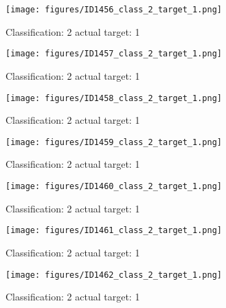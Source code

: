 \begin{figure}[h!]
\begin{center}
\texttt{[image: figures/ID1456\_class\_2\_target\_1.png]}
\end{center}
\caption{ Classification: 2 actual target: 1}
\label{fig:ID1456_class_2_target_1}
\end{figure}
\begin{figure}[h!]
\begin{center}
\texttt{[image: figures/ID1457\_class\_2\_target\_1.png]}
\end{center}
\caption{ Classification: 2 actual target: 1}
\label{fig:ID1457_class_2_target_1}
\end{figure}
\begin{figure}[h!]
\begin{center}
\texttt{[image: figures/ID1458\_class\_2\_target\_1.png]}
\end{center}
\caption{ Classification: 2 actual target: 1}
\label{fig:ID1458_class_2_target_1}
\end{figure}
\begin{figure}[h!]
\begin{center}
\texttt{[image: figures/ID1459\_class\_2\_target\_1.png]}
\end{center}
\caption{ Classification: 2 actual target: 1}
\label{fig:ID1459_class_2_target_1}
\end{figure}
\begin{figure}[h!]
\begin{center}
\texttt{[image: figures/ID1460\_class\_2\_target\_1.png]}
\end{center}
\caption{ Classification: 2 actual target: 1}
\label{fig:ID1460_class_2_target_1}
\end{figure}
\begin{figure}[h!]
\begin{center}
\texttt{[image: figures/ID1461\_class\_2\_target\_1.png]}
\end{center}
\caption{ Classification: 2 actual target: 1}
\label{fig:ID1461_class_2_target_1}
\end{figure}
\begin{figure}[h!]
\begin{center}
\texttt{[image: figures/ID1462\_class\_2\_target\_1.png]}
\end{center}
\caption{ Classification: 2 actual target: 1}
\label{fig:ID1462_class_2_target_1}
\end{figure}
